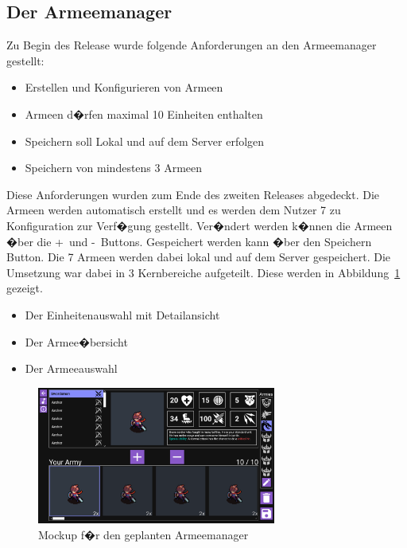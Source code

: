 \documentclass[12pt, titlepage]{scrartcl}
\newcommand{\Abb}[1]{%
	Abbildung\ \ref{#1}%
}
\begin{document}
			\subsection{Der Armeemanager}
			Zu Begin des Release wurde folgende Anforderungen an den Armeemanager gestellt:
			\begin{itemize}
				\item Erstellen und Konfigurieren von Armeen
				\item Armeen d�rfen maximal 10 Einheiten enthalten
				\item Speichern soll Lokal und auf dem Server erfolgen
				\item Speichern von mindestens 3 Armeen
			\end{itemize}
			Diese Anforderungen wurden zum Ende des zweiten Releases abgedeckt. Die Armeen werden automatisch erstellt und es werden dem Nutzer 7 zu Konfiguration zur Verf�gung gestellt. Ver�ndert werden k�nnen die Armeen �ber die \glqq +\grqq \ und \glqq -\grqq \ Buttons. Gespeichert werden kann �ber den Speichern Button. Die 7 Armeen werden dabei lokal und auf dem Server gespeichert. Die Umsetzung war dabei in 3 Kernbereiche aufgeteilt. Diese werden in \Abb{MockUpArmeemanager} gezeigt.
			\begin{itemize}
				\item Der Einheitenauswahl mit Detailansicht
				\item Der Armee�bersicht
				\item Der Armeeauswahl
			\end{itemize} 
		
			\begin{figure}[H] 
				\centering
				\includegraphics[width=0.7\textwidth]{ArmyBuilderMockUp.png}
				\caption{Mockup f�r den geplanten Armeemanager}
				\label{MockUpArmeemanager}
			\end{figure}
			
\end{document}
